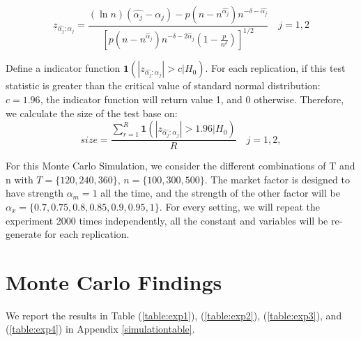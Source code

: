 	\[  z_{\hat{\alpha_j}:\alpha_j} =\frac{(\ln n)\left(\hat{\alpha_j}-\alpha_{j}\right)-p\left(n-n^{\hat{\alpha_j}}\right) n^{-\delta-\hat{\alpha_j}}}{\left[p\left(n-n^{\hat{\alpha}_j}\right) n^{-\delta-2 \hat{\alpha}_j}\left(1-\frac{p}{n^{\delta}}\right)\right]^{1 / 2}}\quad j=1,2 \tag{9}  \label{z_indicator}\]

Define a indicator function $\bm{1}(|z_{\hat{\alpha_j}:\alpha_j} |>c|H_0)$.
For each replication, if this test statistic is greater than the critical value of standard normal distribution: $c = 1.96$, the indicator function will return value 1, and 0 otherwise.
Therefore, we calculate the size of the test base on:
	\[ size = \frac{\sum_{r=1}^{R} \bm{1}(|z_{\hat{\alpha_j}:\alpha_j} |>1.96|H_0)}{R} \quad j =1,2 \tag{10}, \label{size_calculator}\]


For this Monte Carlo Simulation, we consider the different combinations of T and n with $T = \{120, 240, 360\}$, $n =\{100, 300, 500\} $.
The market factor is designed to have strength $\alpha_m = 1$ all the time, and the strength of the other factor will be $\alpha_{x} = \{0.7, 0.75, 0.8,0.85, 0.9,0.95, 1\}$. For every setting, we will repeat the experiment 2000 times independently, all the constant and variables will be re-generate for each replication.


 
	\section{Monte Carlo Findings}\label{MC_findings}
We report the results in Table (\ref{table:exp1}), (\ref{table:exp2}), (\ref{table:exp3}), and (\ref{table:exp4}) in Appendix \ref{simulationtable}.

